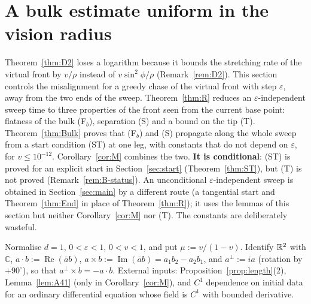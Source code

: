 
\newcommand{\Bjs}{j_{\mathrm s}}
\newcommand{\Bts}{t_{\mathrm s}}
\newcommand{\BLs}{L_{\mathrm s}}
\newcommand{\BTs}{T_{\mathrm s}}
\newcommand{\BF}{\mathcal F}

\section{A bulk estimate uniform in the vision radius}\label{sec:bulk}

Theorem~\ref{thm:D2} loses a logarithm because it bounds the stretching rate of the virtual front by $v/\rho$ instead of
$v\sin^2\!\phi/\rho$ (Remark~\ref{rem:D2}). This section controls the misalignment for a greedy chase of the virtual front with
step $\varepsilon$, away from the two ends of the sweep. Theorem~\ref{thm:R} reduces an $\varepsilon$-independent sweep time to three
properties of the front seen from the current base point: flatness of the bulk \textup{(F$_b$)}, separation \textup{(S)} and a bound
on the tip \textup{(T)}. Theorem~\ref{thm:Bulk} proves that \textup{(F$_b$)} and \textup{(S)} propagate along the whole sweep from a
start condition \textup{(ST)} at one leg, with constants that do not depend on $\varepsilon$, for $v\le10^{-12}$.
Corollary~\ref{cor:M} combines the two. \textbf{It is conditional}: \textup{(ST)} is proved for an explicit start in
Section~\ref{sec:start} (Theorem~\ref{thm:ST}), but \textup{(T)} is not proved (Remark~\ref{rem:B-status}).
An unconditional $\varepsilon$-independent sweep is obtained in Section~\ref{sec:main} by a different route (a tangential start and
Theorem~\ref{thm:End} in place of Theorem~\ref{thm:R}); it uses the lemmas of this section but neither Corollary~\ref{cor:M} nor
\textup{(T)}. The constants are deliberately wasteful.

Normalise $d=1$, $0<\varepsilon<1$, $0<v<1$, and put $\mu:=v/(1-v)$. Identify $\mathbb{R}^2$ with $\mathbb C$,
$a\cdot b:=\operatorname{Re}(\bar ab)$, $a\times b:=\operatorname{Im}(\bar ab)=a_1b_2-a_2b_1$, and $a^\perp:=ia$ (rotation by
$+90^\circ$), so that $a^\perp\times b=-a\cdot b$. External inputs: Proposition~\ref{prop:length}(2), Lemma~\ref{lem:A41} (only in
Corollary~\ref{cor:M}), and $C^1$ dependence on initial data for an ordinary differential equation whose field is $C^1$ with bounded
derivative.

